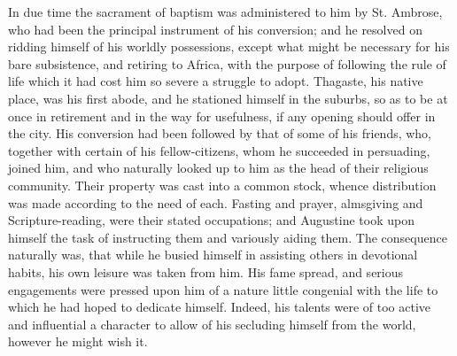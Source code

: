 In due time the sacrament of baptism was administered to him by St.
Ambrose, who had been the principal instrument of his conversion; and
he resolved on ridding himself of his worldly possessions, except what
might be necessary for his bare subsistence, and retiring to Africa,
with the purpose of following the rule of life which it had cost him
so severe a struggle to adopt. Thagaste, his native place, was his
first abode, and he stationed himself in the suburbs, so as to be at
once in retirement and in the way for usefulness, if any opening
should offer in the city. His conversion had been followed by that of
some of his friends, who, together with certain of his
fellow-citizens, whom he succeeded in persuading, joined him, and who
naturally looked up to him as the head of their religious community.
Their property was cast into a common stock, whence distribution was
made according to the need of each. Fasting and prayer, almsgiving and
Scripture-reading, were their stated occupations; and Augustine took
upon himself the task of instructing them and variously aiding them.
The consequence naturally was, that while he busied himself in
assisting others in devotional habits, his own leisure was taken from
him. His fame spread, and serious engagements were pressed upon him of
a nature little congenial with the life to which he had hoped to
dedicate himself. Indeed, his talents were of too active and influential a character to allow of his secluding himself from the
world, however he might wish it.

